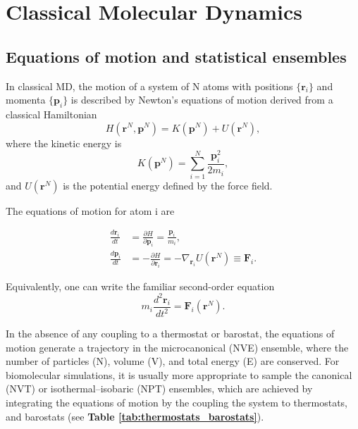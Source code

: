 \documentclass[12pt]{article}
\begin{document}
\section{Classical Molecular Dynamics}

\subsection{Equations of motion and statistical ensembles}

In classical MD, the motion of a system of N atoms with positions $\{\mathbf{r}_i\}$ and momenta $\{\mathbf{p}_i\}$ is described by Newton's equations of motion derived from a classical Hamiltonian
\[
H(\mathbf{r}^N,\mathbf{p}^N) = K(\mathbf{p}^N) + U(\mathbf{r}^N),
\]
where the kinetic energy is
\[
K(\mathbf{p}^N) = \sum_{i=1}^{N} \frac{\mathbf{p}_i^2}{2m_i},
\]
and $U(\mathbf{r}^N)$ is the potential energy defined by the force field.\cite{CH9_FrenkelSmit2023,CH9_AllenTildesley2017}

The equations of motion for atom i are

\begin{align}
\frac{d\mathbf{r}_i}{dt} &= \frac{\partial H}{\partial \mathbf{p}_i} = \frac{\mathbf{p}_i}{m_i}, \\
\frac{d\mathbf{p}_i}{dt} &= -\frac{\partial H}{\partial \mathbf{r}_i} = -\nabla_{\mathbf{r}_i} U(\mathbf{r}^N) \equiv \mathbf{F}_i.
\end{align}

Equivalently, one can write the familiar second-order equation
\[
m_i \frac{d^2 \mathbf{r}_i}{dt^2} = \mathbf{F}_i(\mathbf{r}^N).
\]

In the absence of any coupling to a thermostat or barostat, the equations of motion generate a trajectory in the microcanonical (NVE) ensemble, where the number of particles (N), volume (V), and total energy (E) are conserved. For biomolecular simulations, it is usually more appropriate to sample the canonical (NVT) or isothermal--isobaric (NPT) ensembles, which are achieved by integrating the equations of motion by the coupling the system to thermostats, and barostats (see \textbf{Table \ref{tab:thermostats_barostats}}).\cite{CH9_Martyna1992,CH9_ParrinelloRahman1981,CH9_bussi2007canonical}
\end{document}
